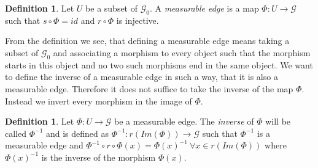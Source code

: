 \documentclass[12pt,a4paper]{scrartcl}
\theoremstyle{plain}
\theoremstyle{definition}
\newtheorem{Definition}[Theorem]{Definition}
\numberwithin{equation}{section}
\newcommand{\2}{\mathbb{Z} / 2 \mathbb{Z}}
\newcommand{\G}{\mathcal{G}}
\newcommand{\1}{\bar{1}}
\newcommand{\0}{\bar{0}}
\begin{document}
\begin{Definition}
	Let $U$ be a subset of $\G_0$. A \emph{measurable edge} is a map $\Phi:U \to \G$ such that $s \circ \Phi = id$ and $r \circ \Phi$ is injective.
\end{Definition}
From the definition we see, that defining a measurable edge means taking a subset of $\G_0$ and associating a morphism to every object such that the morphism starts in this object and no two such morphisms end in the same object. We want to define the inverse of a measurable edge in such a way, that it is also a measurable edge. Therefore it does not suffice to take the inverse of the map $\Phi$. Instead we invert every morphism in the image of $\Phi$.
\begin{Definition}
	Let $\Phi: U \to \G$ be a measurable edge. The \emph{inverse} of $\Phi$ will be called $\Phi^{-1}$ and is defined as $\Phi^{-1}:r(Im(\Phi)) \to \G$ such that $\Phi^{-1}$ is a measurable edge and $\Phi^{-1} \circ r \circ \Phi (x) = \Phi (x)^{-1} \ \forall x \in r(Im(\Phi))$ where $\Phi (x)^{-1}$ is the inverse of the morphism $\Phi (x)$.
\end{Definition}
\end{document}
